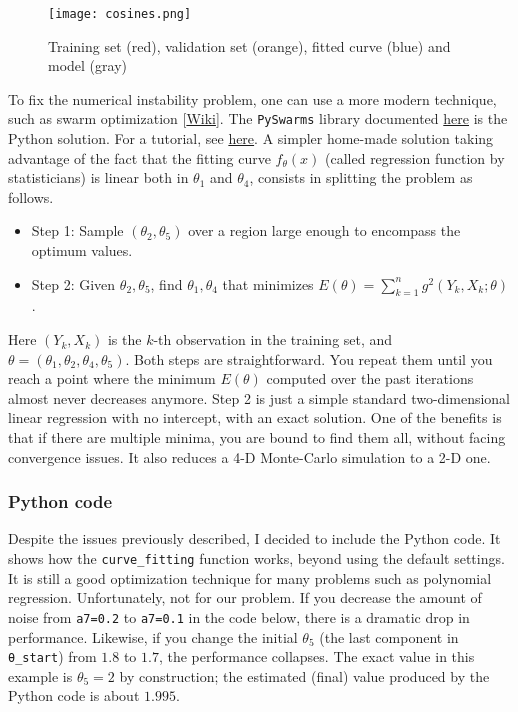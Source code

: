 \documentclass[oneside,10pt]{book}
\begin{document}
\begin{figure}[H]
\centering
\texttt{[image: cosines.png]}  
\caption{Training set (red), validation set (orange), fitted curve (blue) and model (gray)}
\label{fig:pyplot1}
\end{figure}

To fix the numerical instability problem, one can use a more modern technique, such as \textcolor{index}{swarm optimization} [\href{https://en.wikipedia.org/wiki/Particle_swarm_optimization}{Wiki}]. The \texttt{PySwarms} library documented \href{https://pyswarms.readthedocs.io/en/latest/}{here} 
 is the Python solution. For a tutorial, see 
 \href{https://machinelearningmastery.com/a-gentle-introduction-to-particle-swarm-optimization/}{here}. A simpler home-made solution taking 
advantage of the fact that the fitting curve $f_\theta(x)$ (called regression function by statisticians) is linear both in $\theta_1$ and
 $\theta_4$,  consists in splitting the problem as follows.

\begin{itemize}
\item Step 1: Sample $(\theta_2,\theta_5)$ over a region large enough to encompass the optimum values.
\item Step 2:  Given $\theta_2,\theta_5$, find $\theta_1,\theta_4$ that minimizes $E(\theta)=\sum_{k=1}^n g^2(Y_k,X_k;\theta)$. 
\end{itemize}
Here $(Y_k,X_k)$ is the $k$-th observation in the training set, and $\theta=(\theta_1,\theta_2, \theta_4,\theta_5)$. Both steps are straightforward.  
You repeat them until you reach a point where the minimum $E(\theta)$ computed over the past iterations almost never decreases anymore. Step 2 is just a simple standard two-dimensional linear regression with no intercept, with an exact solution. One of the benefits is that if there are
 multiple minima, you are bound to find them all, without facing convergence issues. It also reduces a 4-D Monte-Carlo simulation to a 2-D one.



\subsubsection{Python code}\label{poihgf}

Despite the issues previously described, I decided to include the Python code. It shows how the \texttt{curve\_fitting} function works, beyond using the default settings.
 It is still a good optimization technique for many problems such as polynomial regression. Unfortunately, not for our problem. If you decrease
 the amount of noise from \texttt{a7=0.2} to \texttt{a7=0.1} in the code below, there is a dramatic drop in performance. Likewise, if you change the  initial $\theta_5$ (the last component in  \texttt{\textcolor{gray2}{θ}\_start}) 
  from 
$1.8$ to $1.7$, the performance collapses. The exact value in this example is $\theta_5=2$ by construction; the estimated
 (final) value produced by the Python code is about $1.995$. 
\end{document}
